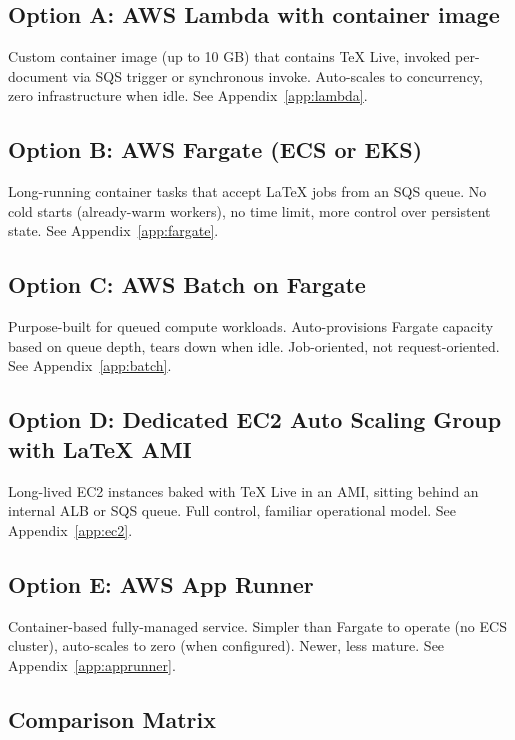 \documentclass[11pt,letterpaper]{article}
\begin{document}
\subsection{Option A: AWS Lambda with container image}
Custom container image (up to 10 GB) that contains TeX Live, invoked per-document via SQS trigger or synchronous invoke. Auto-scales to concurrency, zero infrastructure when idle. See Appendix~\ref{app:lambda}.

\subsection{Option B: AWS Fargate (ECS or EKS)}
Long-running container tasks that accept LaTeX jobs from an SQS queue. No cold starts (already-warm workers), no time limit, more control over persistent state. See Appendix~\ref{app:fargate}.

\subsection{Option C: AWS Batch on Fargate}
Purpose-built for queued compute workloads. Auto-provisions Fargate capacity based on queue depth, tears down when idle. Job-oriented, not request-oriented. See Appendix~\ref{app:batch}.

\subsection{Option D: Dedicated EC2 Auto Scaling Group with LaTeX AMI}
Long-lived EC2 instances baked with TeX Live in an AMI, sitting behind an internal ALB or SQS queue. Full control, familiar operational model. See Appendix~\ref{app:ec2}.

\subsection{Option E: AWS App Runner}
Container-based fully-managed service. Simpler than Fargate to operate (no ECS cluster), auto-scales to zero (when configured). Newer, less mature. See Appendix~\ref{app:apprunner}.

\subsection{Comparison Matrix}
\end{document}
